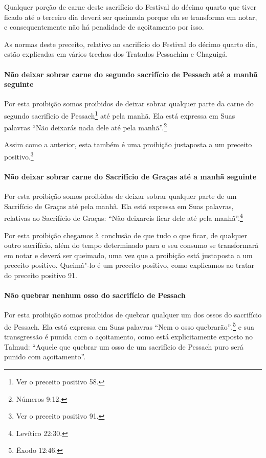 \begin{multicols}{2}
Qualquer porção de carne deste sacrifício do Festival do décimo quarto
que tiver ficado até o terceiro dia deverá ser queimada porque ela se
transforma em notar\starr, e consequentemente não há penalidade de
açoitamento por isso.

As normas deste preceito, relativo ao sacrifício do Festival do décimo
quarto dia, estão explicadas em vários trechos dos Tratados Pessachim\starr{} e
Chaguigá\starr.

\paragraph{Não deixar sobrar carne do segundo sacrifício de Pessach\starr{} até a manhã seguinte}

Por esta proibição somos proibidos de deixar sobrar qualquer parte da
carne do segundo sacrifício de Pessach\starr\footnote{Ver o preceito positivo 58.} até pela
manhã. Ela está expressa em Suas palavras ``Não deixarás nada dele até
pela manhã''.\footnote{Números 9:12.}

Assim como a anterior, esta também é uma proibição justaposta a um
preceito positivo.\footnote{Ver o preceito positivo 91.}

\paragraph{Não deixar sobrar carne do Sacrifício de Graças até a manhã seguinte}

Por esta proibição somos proibidos de deixar sobrar qualquer parte de um
Sacrifício de Graças até pela manhã. Ela está expressa em Suas palavras,
relativas ao Sacrifício de Graças: ``Não deixareis ficar dele até pela
manhã''.\footnote{Levítico 22:30.}

Por esta proibição chegamos à conclusão de que tudo o que ficar, de
qualquer outro sacrifício, além do tempo determinado para o seu consumo
se transformará em notar\starr{} e deverá ser queimado, uma vez que a
proibição está justaposta a um preceito positivo. Queimá"-lo é um
preceito positivo, como explicamos ao tratar do preceito positivo 91.

\paragraph{Não quebrar nenhum osso do sacrifício de Pessach\starr{}}

Por esta proibição somos proibidos de quebrar qualquer um dos ossos do
sacrifício de Pessach\starr. Ela está expressa em Suas palavras ``Nem o
osso quebrarão'',\footnote{Êxodo 12:46.} e sua transgressão é punida com o
açoitamento, como está explicitamente exposto no Talmud\starr: ``Aquele que
quebrar um osso de um sacrifício de Pessach\starr{} puro será punido com
açoitamento''.



\end{multicols}
